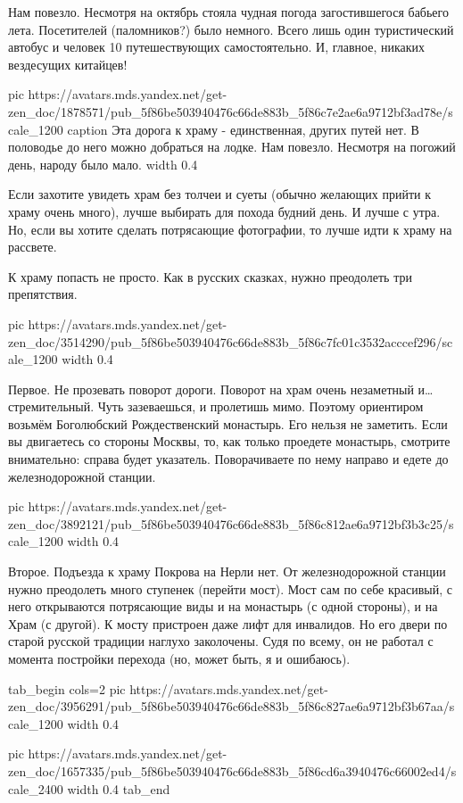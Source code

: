Нам повезло. Несмотря на октябрь стояла чудная погода загостившегося бабьего
лета. Посетителей (паломников?) было немного. Всего лишь один туристический
автобус и человек 10 путешествующих самостоятельно. И, главное, никаких
вездесущих китайцев!

\ifcmt
  pic https://avatars.mds.yandex.net/get-zen_doc/1878571/pub_5f86be503940476c66de883b_5f86c7e2ae6a9712bf3ad78e/scale_1200
  caption Эта дорога к храму - единственная, других путей нет. В половодье до него можно добраться на лодке. Нам повезло. Несмотря на погожий день, народу было мало.
  width 0.4
\fi

Если захотите увидеть храм без толчеи и суеты (обычно желающих прийти к храму
очень много), лучше выбирать для похода будний день. И лучше с утра. Но, если
вы хотите сделать потрясающие фотографии, то лучше идти к храму на рассвете.

К храму попасть не просто. Как в русских сказках, нужно преодолеть три
препятствия.

\ifcmt
  pic https://avatars.mds.yandex.net/get-zen_doc/3514290/pub_5f86be503940476c66de883b_5f86c7fc01c3532acccef296/scale_1200
  width 0.4
\fi

Первое. Не прозевать поворот дороги. Поворот на храм очень незаметный и…
стремительный. Чуть зазеваешься, и пролетишь мимо. Поэтому ориентиром возьмём
Боголюбский Рождественский монастырь. Его нельзя не заметить. Если вы
двигаетесь со стороны Москвы, то, как только проедете монастырь, смотрите
внимательно: справа будет указатель. Поворачиваете по нему направо и едете до
железнодорожной станции.

\ifcmt
  pic https://avatars.mds.yandex.net/get-zen_doc/3892121/pub_5f86be503940476c66de883b_5f86c812ae6a9712bf3b3c25/scale_1200
  width 0.4
\fi

Второе. Подъезда к храму Покрова на Нерли нет. От железнодорожной станции нужно
преодолеть много ступенек (перейти мост). Мост сам по себе красивый, с него
открываются потрясающие виды и на монастырь (с одной стороны), и на Храм (с
другой). К мосту пристроен даже лифт для инвалидов. Но его двери по старой
русской традиции наглухо заколочены. Судя по всему, он не работал с момента
постройки перехода (но, может быть, я и ошибаюсь).

\ifcmt
tab_begin cols=2
  pic https://avatars.mds.yandex.net/get-zen_doc/3956291/pub_5f86be503940476c66de883b_5f86c827ae6a9712bf3b67aa/scale_1200
  width 0.4

  pic https://avatars.mds.yandex.net/get-zen_doc/1657335/pub_5f86be503940476c66de883b_5f86cd6a3940476c66002ed4/scale_2400
  width 0.4
tab_end
\fi

